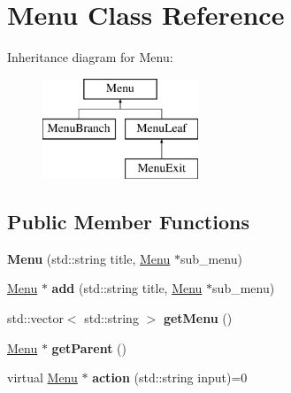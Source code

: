\hypertarget{class_menu}{}\section{Menu Class Reference}
\label{class_menu}
Inheritance diagram for Menu\+:\begin{figure}[H]
\begin{center}
\leavevmode
\includegraphics[height=3.000000cm]{class_menu}
\end{center}
\end{figure}
\subsection*{Public Member Functions}
\begin{DoxyCompactItemize}
\item 
\hypertarget{class_menu_a7da7bee39912b38ada59667090c95d45}{}{\bfseries Menu} (std\+::string title, \hyperlink{class_menu}{Menu} $\ast$sub\+\_\+menu)\label{class_menu_a7da7bee39912b38ada59667090c95d45}

\item 
\hypertarget{class_menu_a3baa9052815a249c1e149a7040bcd4ca}{}\hyperlink{class_menu}{Menu} $\ast$ {\bfseries add} (std\+::string title, \hyperlink{class_menu}{Menu} $\ast$sub\+\_\+menu)\label{class_menu_a3baa9052815a249c1e149a7040bcd4ca}

\item 
\hypertarget{class_menu_a4bd9e81608d3fc5e7f1842b6987a1f04}{}std\+::vector$<$ std\+::string $>$ {\bfseries get\+Menu} ()\label{class_menu_a4bd9e81608d3fc5e7f1842b6987a1f04}

\item 
\hypertarget{class_menu_ae29e1187192f79766d1ccfad7e757381}{}\hyperlink{class_menu}{Menu} $\ast$ {\bfseries get\+Parent} ()\label{class_menu_ae29e1187192f79766d1ccfad7e757381}

\item 
\hypertarget{class_menu_ae742121ce17557526642251a67f32dd0}{}virtual \hyperlink{class_menu}{Menu} $\ast$ {\bfseries action} (std\+::string input)=0\label{class_menu_ae742121ce17557526642251a67f32dd0}

\end{DoxyCompactItemize}
